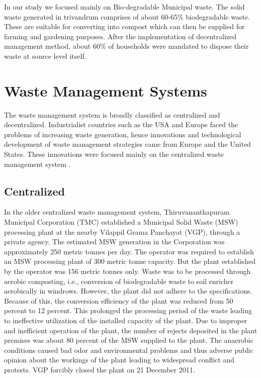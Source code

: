 \documentclass[12pt,a4paper]{report}
\begin{document}
In our study we focused mainly on Bio-degradable Municipal waste. The solid waste generated in trivandrum comprises of about 60-65\% biodegradable waste. These are suitable for converting into compost which can then be supplied for farming and gardening purposes. After the implementation of decentralized management method, about 60\% of households were mandated to dispose their waste at source level itself. 

\chapter{\textbf{Waste Management Systems}}

The waste management system is broadly classified as centralized and decentralized. Industrialist countries such as the USA and Europe faced the problems of increasing waste generation, hence innovations and technological development of waste management strategies came from Europe and the United States. These innovations were focused mainly on the centralized waste management system \cite{cdm}.

\section{Centralized}
\label{cent}
In the older centralized waste management system, Thiruvananthapuram Municipal Corporation (TMC) established a Municipal Solid Waste (MSW) processing plant at the nearby Vilappil Grama Panchayat (VGP), through a private agency. The estimated MSW generation in the Corporation was approximately 250 metric tonnes per day. The operator was required to establish an MSW processing plant of 300 metric tonne capacity. But the plant established by the operator was 156 metric tonnes only. Waste was to be processed through aerobic composting, i.e., conversion of biodegradable waste to soil enricher aerobically in windrows. However, the plant did not adhere to the specifications. Because of this, the conversion efficiency of the plant was reduced from 50 percent to 12 percent. This prolonged the processing period of the waste leading to ineffective utilization of the installed capacity of the plant. Due to improper and inefficient operation of the plant, the number of rejects deposited in the plant premises was about 80 percent of the MSW supplied to the plant. The anaerobic conditions caused bad odor and environmental problems and thus adverse public opinion about the workings of the plant leading to widespread conflict and protests. VGP forcibly closed the plant on 21 December 2011.
\end{document}
